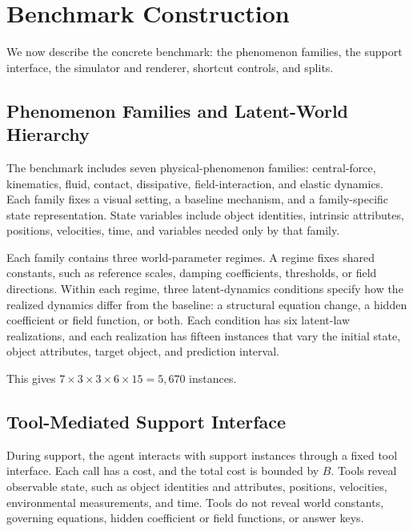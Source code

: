 \section{Benchmark Construction}
\label{sec:construction}

We now describe the concrete benchmark: the phenomenon families, the support interface, the simulator and renderer, shortcut controls, and splits.

\subsection{Phenomenon Families and Latent-World Hierarchy}

The benchmark includes seven physical-phenomenon families: central-force, kinematics, fluid, contact, dissipative, field-interaction, and elastic dynamics. Each family fixes a visual setting, a baseline mechanism, and a family-specific state representation. State variables include object identities, intrinsic attributes, positions, velocities, time, and variables needed only by that family.

Each family contains three world-parameter regimes. A regime fixes shared constants, such as reference scales, damping coefficients, thresholds, or field directions. Within each regime, three latent-dynamics conditions specify how the realized dynamics differ from the baseline: a structural equation change, a hidden coefficient or field function, or both. Each condition has six latent-law realizations, and each realization has fifteen instances that vary the initial state, object attributes, target object, and prediction interval.

This gives $7 \times 3 \times 3 \times 6 \times 15 = 5{,}670$ instances. 

\subsection{Tool-Mediated Support Interface}
\label{sec:construction:tools}

During support, the agent interacts with support instances through a fixed tool interface. Each call has a cost, and the total cost is bounded by $B$. Tools reveal observable state, such as object identities and attributes, positions, velocities, environmental measurements, and time. Tools do not reveal world constants, governing equations, hidden coefficient or field functions, or answer keys.

